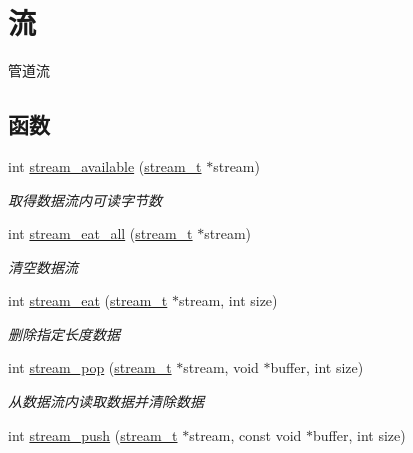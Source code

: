 \hypertarget{a00108}{}\section{流}
\label{a00108}


管道流  


\subsection*{函数}
\begin{DoxyCompactItemize}
\item 
int \hyperlink{a00108_ga6e109b2dc520782567dc1891af3b945e_ga6e109b2dc520782567dc1891af3b945e}{stream\+\_\+available} (\hyperlink{a00051_a261dba04f46f5c59a68a05f69f5a65a8_a261dba04f46f5c59a68a05f69f5a65a8}{stream\+\_\+t} $\ast$stream)
\begin{DoxyCompactList}\small\item\em 取得数据流内可读字节数 \end{DoxyCompactList}\item 
int \hyperlink{a00108_gaef7f4ca2c201faf5d82a1dad4c8d7814_gaef7f4ca2c201faf5d82a1dad4c8d7814}{stream\+\_\+eat\+\_\+all} (\hyperlink{a00051_a261dba04f46f5c59a68a05f69f5a65a8_a261dba04f46f5c59a68a05f69f5a65a8}{stream\+\_\+t} $\ast$stream)
\begin{DoxyCompactList}\small\item\em 清空数据流 \end{DoxyCompactList}\item 
int \hyperlink{a00108_ga1ab922f8bab979099b3abc3ee54dc59d_ga1ab922f8bab979099b3abc3ee54dc59d}{stream\+\_\+eat} (\hyperlink{a00051_a261dba04f46f5c59a68a05f69f5a65a8_a261dba04f46f5c59a68a05f69f5a65a8}{stream\+\_\+t} $\ast$stream, int size)
\begin{DoxyCompactList}\small\item\em 删除指定长度数据 \end{DoxyCompactList}\item 
int \hyperlink{a00108_ga6e01758abf49f8b08cd457f1cb48a954_ga6e01758abf49f8b08cd457f1cb48a954}{stream\+\_\+pop} (\hyperlink{a00051_a261dba04f46f5c59a68a05f69f5a65a8_a261dba04f46f5c59a68a05f69f5a65a8}{stream\+\_\+t} $\ast$stream, void $\ast$buffer, int size)
\begin{DoxyCompactList}\small\item\em 从数据流内读取数据并清除数据 \end{DoxyCompactList}\item 
int \hyperlink{a00108_gae7e63ef142733eb3aea7401e28bc9a75_gae7e63ef142733eb3aea7401e28bc9a75}{stream\+\_\+push} (\hyperlink{a00051_a261dba04f46f5c59a68a05f69f5a65a8_a261dba04f46f5c59a68a05f69f5a65a8}{stream\+\_\+t} $\ast$stream, const void $\ast$buffer, int size)

\end{DoxyCompactItemize}
